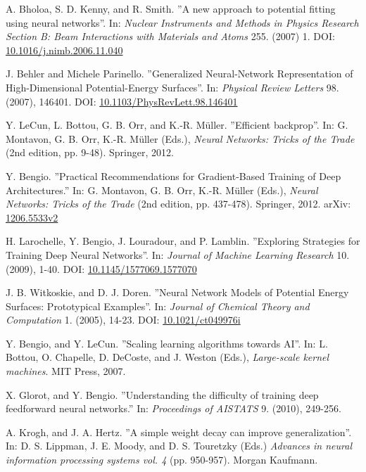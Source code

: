\documentclass[twoside,english]{uiofysmaster}
\begin{document}
\begin{thebibliography}{56}
 A. Bholoa, S. D. Kenny, and R. Smith.
 ''A new approach to potential fitting using neural networks''.
 In: \textit{Nuclear Instruments and Methods in Physics Research Section B: 
 Beam Interactions with Materials and Atoms} 255. (2007) 1.
 DOI: \href{https://doi.org/10.1016/j.nimb.2006.11.040}{10.1016/j.nimb.2006.11.040}
 
 J. Behler and Michele Parinello. 
 ''Generalized Neural-Network Representation of High-Dimensional Potential-Energy Surfaces''.
 In: \textit{Physical Review Letters} 98. (2007), 146401. 
 DOI: \href{http://dx.doi.org/10.1103/PhysRevLett.98.146401}{10.1103/PhysRevLett.98.146401}
 
 Y. LeCun, L. Bottou, G. B. Orr, and K.-R. Müller.
 ''Efficient backprop''. 
 In: G. Montavon, G. B. Orr, K.-R. Müller (Eds.), \textit{Neural Networks: Tricks of the Trade} (2nd edition, pp. 9-48).
 Springer, 2012. 
 
 Y. Bengio. 
 ''Practical Recommendations for Gradient-Based Training of Deep Architectures.''
 In: G. Montavon, G. B. Orr, K.-R. Müller (Eds.), \textit{Neural Networks: Tricks of the Trade} (2nd edition, pp. 437-478). 
 Springer, 2012. 
 arXiv: \href{arxiv.org/abs/1206.5533v2}{1206.5533v2}
 
 H. Larochelle, Y. Bengio, J. Louradour, and P. Lamblin. 
 ''Exploring Strategies for Training Deep Neural Networks''. 
 In: \textit{Journal of Machine Learning Research} 10. (2009), 1-40. 
 DOI: \href{http://doi.org/10.1145/1577069.1577070}{10.1145/1577069.1577070}
 
 J. B. Witkoskie, and D. J. Doren. 
 ''Neural Network Models of Potential Energy Surfaces: Prototypical Examples''. 
 In: \textit{Journal of Chemical Theory and Computation} 1. (2005), 14-23. 
 DOI: \href{http://doi.org/10.1021/ct049976i}{10.1021/ct049976i}
 
 Y. Bengio, and Y. LeCun. 
 ''Scaling learning algorithms towards AI''. 
 In: L. Bottou, O. Chapelle, D. DeCoste, and J. Weston (Eds.), 
 \textit{Large-scale kernel machines}. MIT Press, 2007. 
 
 X. Glorot, and Y. Bengio. 
 ''Understanding the difficulty of training deep feedforward neural networks.''
 In: \textit{Proceedings of AISTATS} 9. (2010), 249-256. 
 
 A. Krogh, and J. A. Hertz. 
 ''A simple weight decay can improve generalization''.
 In: D. S. Lippman, J. E. Moody, and D. S. Touretzky (Eds.)
 \textit{Advances in neural information processing systems vol. 4} (pp. 950-957). 
 Morgan Kaufmann. 
 

\end{thebibliography}
\end{document}
